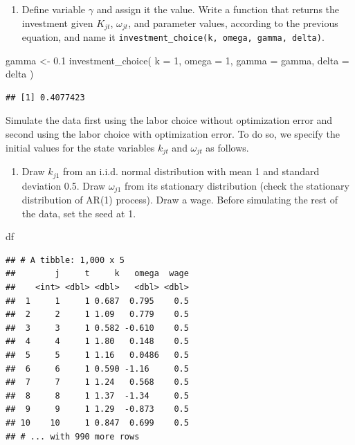 \documentclass[
]{book}
\newenvironment{Shaded}{\begin{snugshade}}{\end{snugshade}}
\newcommand{\AttributeTok}[1]{\textcolor[rgb]{0.77,0.63,0.00}{#1}}
\newcommand{\DecValTok}[1]{\textcolor[rgb]{0.00,0.00,0.81}{#1}}
\newcommand{\FloatTok}[1]{\textcolor[rgb]{0.00,0.00,0.81}{#1}}
\newcommand{\FunctionTok}[1]{\textcolor[rgb]{0.00,0.00,0.00}{#1}}
\newcommand{\NormalTok}[1]{#1}
\newcommand{\OtherTok}[1]{\textcolor[rgb]{0.56,0.35,0.01}{#1}}
\providecommand{\tightlist}{%
  \setlength{\itemsep}{0pt}\setlength{\parskip}{0pt}}
\begin{document}
\begin{enumerate}
\def\labelenumi{\arabic{enumi}.}
\setcounter{enumi}{4}
\tightlist
\item
  Define variable \(\gamma\) and assign it the value. Write a function that returns the investment given \(K_{jt}\), \(\omega_{jt}\), and parameter values, according to the previous equation, and name it \texttt{investment\_choice(k,\ omega,\ gamma,\ delta)}.
\end{enumerate}

\begin{Shaded}
\begin{Highlighting}[]
\NormalTok{gamma }\OtherTok{\textless{}{-}} \FloatTok{0.1}
\FunctionTok{investment\_choice}\NormalTok{(}
  \AttributeTok{k =} \DecValTok{1}\NormalTok{, }
  \AttributeTok{omega =} \DecValTok{1}\NormalTok{, }
  \AttributeTok{gamma =}\NormalTok{ gamma, }
  \AttributeTok{delta =}\NormalTok{ delta}
\NormalTok{  )}
\end{Highlighting}
\end{Shaded}

\begin{verbatim}
## [1] 0.4077423
\end{verbatim}

Simulate the data first using the labor choice without optimization error and second using the labor choice with optimization error. To do so, we specify the initial values for the state variables \(k_{jt}\) and \(\omega_{jt}\) as follows.

\begin{enumerate}
\def\labelenumi{\arabic{enumi}.}
\setcounter{enumi}{5}
\tightlist
\item
  Draw \(k_{j1}\) from an i.i.d. normal distribution with mean 1 and standard deviation 0.5. Draw \(\omega_{j1}\) from its stationary distribution (check the stationary distribution of AR(1) process). Draw a wage. Before simulating the rest of the data, set the seed at 1.
\end{enumerate}

\begin{Shaded}
\begin{Highlighting}[]
\NormalTok{df}
\end{Highlighting}
\end{Shaded}

\begin{verbatim}
## # A tibble: 1,000 x 5
##        j     t     k   omega  wage
##    <int> <dbl> <dbl>   <dbl> <dbl>
##  1     1     1 0.687  0.795    0.5
##  2     2     1 1.09   0.779    0.5
##  3     3     1 0.582 -0.610    0.5
##  4     4     1 1.80   0.148    0.5
##  5     5     1 1.16   0.0486   0.5
##  6     6     1 0.590 -1.16     0.5
##  7     7     1 1.24   0.568    0.5
##  8     8     1 1.37  -1.34     0.5
##  9     9     1 1.29  -0.873    0.5
## 10    10     1 0.847  0.699    0.5
## # ... with 990 more rows
\end{verbatim}
\end{document}
